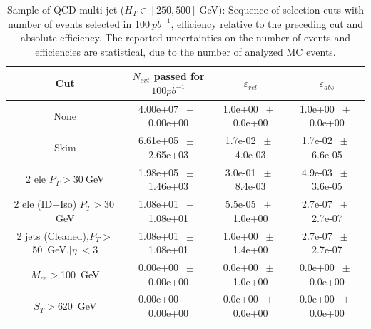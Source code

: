 \begin{table}[htbp] 
\begin{center} 
\begin{tabular}{|c|c|c|c|} 
\hline\hline 
 Cut & $N_{evt}$ passed for $100pb^{-1}$ & $\varepsilon_{rel}$ & $\varepsilon_{abs}$ \\ 
\hline\hline 
None       &        4.00e+07       $~\pm~$       0.00e+00        &        1.0e+00       $~\pm~$       0.0e+00        &        1.0e+00       $~\pm~$       0.0e+00       \\       
       Skim       &        6.61e+05       $~\pm~$       2.65e+03        &        1.7e-02       $~\pm~$       4.0e-03        &        1.7e-02       $~\pm~$       6.6e-05       \\       
       2 ele $P_T>30~$GeV       &        1.98e+05       $~\pm~$       1.46e+03        &        3.0e-01       $~\pm~$       8.4e-03        &        4.9e-03       $~\pm~$       3.6e-05       \\       
       2 ele (ID+Iso) $P_T>30~$GeV       &        1.08e+01       $~\pm~$       1.08e+01        &        5.5e-05       $~\pm~$       1.0e+00        &        2.7e-07       $~\pm~$       2.7e-07       \\       
       2 jets (Cleaned),$P_T>$50~GeV,$|\eta|<$3       &        1.08e+01       $~\pm~$       1.08e+01        &        1.0e+00       $~\pm~$       1.4e+00        &        2.7e-07       $~\pm~$       2.7e-07       \\       
       $M_{ee}>$100~GeV       &        0.00e+00       $~\pm~$       0.00e+00        &        0.0e+00       $~\pm~$       1.0e+00        &        0.0e+00       $~\pm~$       0.0e+00       \\       
       $S_T>$620~GeV       &        0.00e+00       $~\pm~$       0.00e+00        &        0.0e+00       $~\pm~$       0.0e+00        &        0.0e+00       $~\pm~$       0.0e+00       \\       
       \hline\hline 
\end{tabular} 
\end{center} 
\caption{Sample of QCD multi-jet ($H_T \in [250,500]~$GeV): Sequence of selection cuts with number of events selected in 100$~pb^{-1}$, efficiency relative to the preceding cut and absolute efficiency. The reported uncertainties on the number of events and efficiencies are statistical, due to the number of analyzed MC events.} 
\label{tab:effic-QCD-250-500} 
\end{table} 

